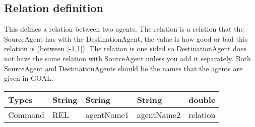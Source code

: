 \documentclass{scrartcl}
\begin{document}
\subsection{Relation definition}
This defines a relation between two agents. The relation is a relation that the SourceAgent has with the DestinationAgent, the value is how good or bad this relation is (between [-1,1]). The relation is one sided so DestinationAgent does not have the same relation with SourceAgent unless you add it separately. Both SourceAgent and DestinationAgents should be the names that the agents are given in GOAL.\\
\begin{tabular}{|l|l|l|l|l|}
	\hline  Types& String & String & String & double\\ 
	\hline  Command & REL & agentName1 & agentName2 & relation \\ 
	\hline 
\end{tabular} 
\\


 
\end{document}
